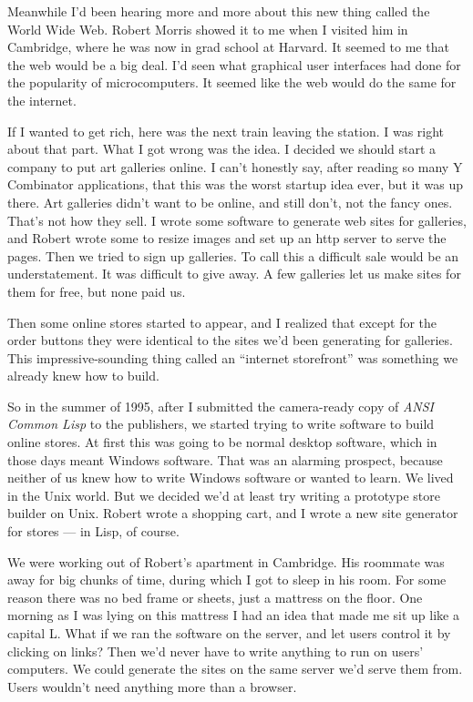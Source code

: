 Meanwhile I'd been hearing more and more about this new thing called the
World Wide Web. Robert Morris showed it to me when I visited him in
Cambridge, where he was now in grad school at Harvard. It seemed to me
that the web would be a big deal. I'd seen what graphical user
interfaces had done for the popularity of microcomputers. It seemed like
the web would do the same for the internet.

If I wanted to get rich, here was the next train leaving the station. I
was right about that part. What I got wrong was the idea. I decided we
should start a company to put art galleries online. I can't honestly
say, after reading so many Y Combinator applications, that this was the
worst startup idea ever, but it was up there. Art galleries didn't want
to be online, and still don't, not the fancy ones. That's not how they
sell. I wrote some software to generate web sites for galleries, and
Robert wrote some to resize images and set up an http server to serve
the pages. Then we tried to sign up galleries. To call this a difficult
sale would be an understatement. It was difficult to give away. A few
galleries let us make sites for them for free, but none paid us.

Then some online stores started to appear, and I realized that except
for the order buttons they were identical to the sites we'd been
generating for galleries. This impressive-sounding thing called an
``internet storefront'' was something we already knew how to build.

So in the summer of 1995, after I submitted the camera-ready copy of
\emph{ANSI Common Lisp} to the publishers, we started trying to write
software to build online stores. At first this was going to be normal
desktop software, which in those days meant Windows software. That was
an alarming prospect, because neither of us knew how to write Windows
software or wanted to learn. We lived in the Unix world. But we decided
we'd at least try writing a prototype store builder on Unix. Robert
wrote a shopping cart, and I wrote a new site generator for stores ---
in Lisp, of course.

We were working out of Robert's apartment in Cambridge. His roommate was
away for big chunks of time, during which I got to sleep in his room.
For some reason there was no bed frame or sheets, just a mattress on the
floor. One morning as I was lying on this mattress I had an idea that
made me sit up like a capital L. What if we ran the software on the
server, and let users control it by clicking on links? Then we'd never
have to write anything to run on users' computers. We could generate the
sites on the same server we'd serve them from. Users wouldn't need
anything more than a browser.

